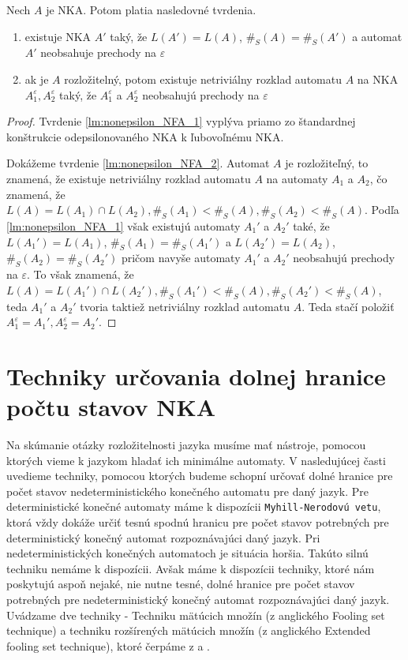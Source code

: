 \begin{lemma}
\label{lm:nonepsilon_NFA}
Nech $ A $ je NKA. Potom platia nasledovné tvrdenia.

\begin{enumerate}[label=(\alph*)]
\item \label{lm:nonepsilon_NFA_1} existuje NKA $ A' $ taký, že $ L(A')=L(A) $, $ \#_S(A)=\#_S(A') $ a automat $ A' $ neobsahuje prechody na $ \varepsilon $
\item \label{lm:nonepsilon_NFA_2} ak je $ A $ rozložitelný, potom existuje netriviálny rozklad automatu $ A $ na NKA $ A_1^{\varepsilon}, A_2^{\varepsilon} $ taký, že $ A_1^{\varepsilon} $ a $ A_2^{\varepsilon} $ neobsahujú prechody na $ \varepsilon $
\end{enumerate}
\end{lemma}

\begin{proof}
Tvrdenie \ref{lm:nonepsilon_NFA_1} vyplýva priamo zo štandardnej konštrukcie odepsilonovaného NKA k ľubovoľnému NKA.
\par
Dokážeme tvrdenie \ref{lm:nonepsilon_NFA_2}. Automat $ A $ je rozložiteľný, to znamená, že existuje netriviálny rozklad automatu $ A $ na automaty $ A_1 $ a $ A_2 $, čo znamená, že $ L(A) = L(A_1) \cap L(A_2), \#_S(A_1) < \#_S(A), \#_S(A_2) < \#_S(A) $. Podľa \ref{lm:nonepsilon_NFA_1} však existujú automaty $ A_1' $ a $ A_2' $ také, že $ L(A_1')=L(A_1) $, $ \#_S(A_1)=\#_S(A_1') $ a $ L(A_2')=L(A_2) $, $ \#_S(A_2)=\#_S(A_2') $ pričom navyše automaty $ A_1' $ a $ A_2' $ neobsahujú prechody na $ \varepsilon $. To však znamená, že $ L(A) = L(A_1') \cap L(A_2'), \#_S(A_1') < \#_S(A), \#_S(A_2') < \#_S(A) $, teda $ A_1' $ a $ A_2' $ tvoria taktiež netriviálny rozklad automatu $ A $. Teda stačí položiť $ A_1^{\varepsilon} = A_1', A_2^{\varepsilon} = A_2'$.
\end{proof}

\section{Techniky určovania dolnej hranice počtu stavov NKA}

Na skúmanie otázky rozložitelnosti jazyka musíme mať nástroje, pomocou ktorých vieme k jazykom hladať ich minimálne automaty. V nasledujúcej časti uvedieme techniky, pomocou ktorých budeme schopní určovať dolné hranice pre počet stavov nedeterministického konečného automatu pre daný jazyk. Pre deterministické konečné automaty máme k dispozícii \verb'Myhill-Nerodovú vetu', ktorá vždy dokáže určiť tesnú spodnú hranicu pre počet stavov potrebných pre deterministický konečný automat rozpoznávajúci daný jazyk. Pri nedeterministických konečných automatoch je situácia horšia. Takúto silnú techniku nemáme k dispozícii. Avšak máme k dispozícii techniky, ktoré nám poskytujú aspoň nejaké, nie nutne tesné, dolné hranice pre počet stavov potrebných pre nedeterministický konečný automat rozpoznávajúci daný jazyk. Uvádzame dve techniky - Techniku mätúcich množín (z anglického Fooling set technique) a techniku rozšírených mätúcich množín (z anglického Extended fooling set technique), ktoré čerpáme z \cite{Palioudakis2012} a \cite{GlaisterShalit1996}.

